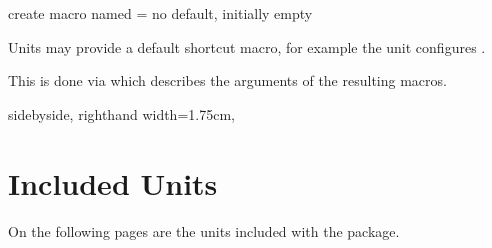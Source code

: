 \documentclass{article}
\begin{document}
\begin{docKey}
	{create macro named}
	{=}
	{no default, initially empty}
	
	Units may provide a default shortcut macro, for example the  unit configures .
	
	This is done via  which describes the arguments of the resulting macros.

\begin{dispExample*}{
	sidebyside,
	righthand width=1.75cm,
}
\end{dispExample*}
\end{docKey}

\clearpage
\section{Included Units} %

\label{units:included}
On the following pages are the units included with the package.


\clearpage
{}


\printindex  %
\end{document}
